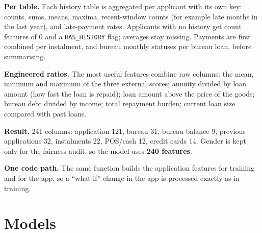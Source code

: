 \documentclass[conference,10pt]{IEEEtran}
\begin{document}
\textbf{Per table.} Each history table is aggregated per applicant with its own key: counts,
sums, means, maxima, recent-window counts (for example late months in the last year), and
late-payment rates. Applicants with no history get count features of 0 and a
\texttt{HAS\_HISTORY} flag; averages stay missing. Payments are first combined per instalment,
and bureau monthly statuses per bureau loan, before summarising.

\textbf{Engineered ratios.} The most useful features combine raw columns: the mean, minimum and
maximum of the three external scores; annuity divided by loan amount (how fast the loan is
repaid); loan amount above the price of the goods; bureau debt divided by income; total
repayment burden; current loan size compared with past loans.

\textbf{Result.} 241 columns: application 121, bureau 31, bureau balance 9, previous
applications 32, instalments 22, POS/cash 12, credit cards 14. Gender is kept only for the
fairness audit, so the model uses \textbf{240 features}.

\textbf{One code path.} The same function builds the application features for training and for
the app, so a ``what-if'' change in the app is processed exactly as in training.

\section{Models}
\label{sec:models}
\end{document}
